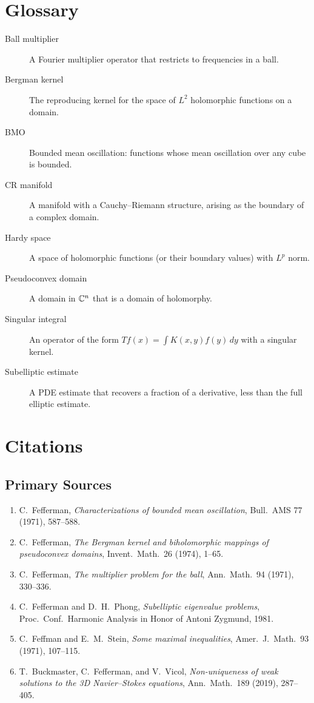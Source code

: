 \section*{Glossary}

\begin{description}
    \item[Ball multiplier] A Fourier multiplier operator that restricts to frequencies in a ball.
    \item[Bergman kernel] The reproducing kernel for the space of $L^2$ holomorphic functions on a domain.
    \item[BMO] Bounded mean oscillation: functions whose mean oscillation over any cube is bounded.
    \item[CR manifold] A manifold with a Cauchy--Riemann structure, arising as the boundary of a complex domain.
    \item[Hardy space] A space of holomorphic functions (or their boundary values) with $L^p$ norm.
    \item[Pseudoconvex domain] A domain in $\mathbb{C}^n$ that is a domain of holomorphy.
    \item[Singular integral] An operator of the form $Tf(x) = \int K(x,y) f(y) \, dy$ with a singular kernel.
    \item[Subelliptic estimate] A PDE estimate that recovers a fraction of a derivative, less than the full elliptic estimate.
\end{description}

\section{Citations}\subsection*{Primary Sources}
\begin{enumerate}
    \item C.\ Fefferman, \textit{Characterizations of bounded mean oscillation}, Bull.\ AMS 77 (1971), 587--588.
    \item C.\ Fefferman, \textit{The Bergman kernel and biholomorphic mappings of pseudoconvex domains}, Invent.\ Math.\ 26 (1974), 1--65.
    \item C.\ Fefferman, \textit{The multiplier problem for the ball}, Ann.\ Math.\ 94 (1971), 330--336.
    \item C.\ Fefferman and D.\ H.\ Phong, \textit{Subelliptic eigenvalue problems}, Proc.\ Conf.\ Harmonic Analysis in Honor of Antoni Zygmund, 1981.
    \item C.\ Feffman and E.\ M.\ Stein, \textit{Some maximal inequalities}, Amer.\ J.\ Math.\ 93 (1971), 107--115.
    \item T.\ Buckmaster, C.\ Fefferman, and V.\ Vicol, \textit{Non-uniqueness of weak solutions to the 3D Navier--Stokes equations}, Ann.\ Math.\ 189 (2019), 287--405.
\end{enumerate}

